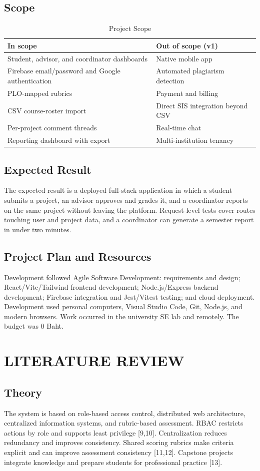 \documentclass[12pt,a4paper]{report}
\begin{document}
\section{Scope}
\begin{table}[H]\centering\caption{Project Scope}\begin{tabularx}{\textwidth}{XX}\toprule\textbf{In scope}&\textbf{Out of scope (v1)}\\\midrule Student, advisor, and coordinator dashboards&Native mobile app\\Firebase email/password and Google authentication&Automated plagiarism detection\\PLO-mapped rubrics&Payment and billing\\CSV course-roster import&Direct SIS integration beyond CSV\\Per-project comment threads&Real-time chat\\Reporting dashboard with export&Multi-institution tenancy\\\bottomrule\end{tabularx}\end{table}
\section{Expected Result}
The expected result is a deployed full-stack application in which a student submits a project, an advisor approves and grades it, and a coordinator reports on the same project without leaving the platform. Request-level tests cover routes touching user and project data, and a coordinator can generate a semester report in under two minutes.
\clearpage\section{Project Plan and Resources}
Development followed Agile Software Development: requirements and design; React/Vite/Tailwind frontend development; Node.js/Express backend development; Firebase integration and Jest/Vitest testing; and cloud deployment. Development used personal computers, Visual Studio Code, Git, Node.js, and modern browsers. Work occurred in the university SE lab and remotely. The budget was 0 Baht.

\clearpage\chapter{LITERATURE REVIEW}
\section{Theory}
The system is based on role-based access control, distributed web architecture, centralized information systems, and rubric-based assessment. RBAC restricts actions by role and supports least privilege [9,10]. Centralization reduces redundancy and improves consistency. Shared scoring rubrics make criteria explicit and can improve assessment consistency [11,12]. Capstone projects integrate knowledge and prepare students for professional practice [13].
\end{document}
